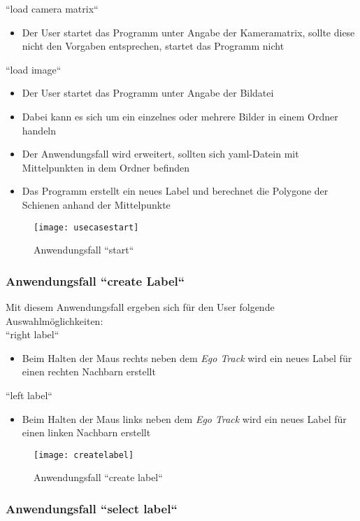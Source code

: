 \noindent
``load camera matrix``
\begin{itemize}
	\item Der User startet das Programm unter Angabe der Kameramatrix, sollte diese nicht den Vorgaben entsprechen, startet das Programm nicht
\end{itemize}
``load image``
\begin{itemize}
	\item Der User startet das Programm unter Angabe der Bildatei
	\item Dabei kann es sich um ein einzelnes oder mehrere Bilder in einem Ordner handeln
	\item Der Anwendungsfall wird erweitert, sollten sich yaml-Datein mit Mittelpunkten in dem Ordner befinden
	\item Das Programm erstellt ein neues Label und berechnet die Polygone der Schienen anhand der Mittelpunkte
\end{itemize}
\begin{figure}[H]
  \texttt{[image: usecasestart]}
  \caption{Anwendungsfall ``start``}
\end{figure}

\subsubsection{Anwendungsfall ``create Label``}
\label{sec:Anwendungsfall ``create Label``}

Mit diesem Anwendungsfall ergeben sich für den User folgende Auswahlmöglichkeiten:
\\

\noindent
``right label``
\begin{itemize}
	\item Beim Halten der Maus rechts neben dem \textit{Ego Track} wird ein neues Label für einen rechten Nachbarn erstellt
\end{itemize}
``left label``
\begin{itemize}
	\item Beim Halten der Maus links neben dem \textit{Ego Track} wird ein neues Label für einen linken Nachbarn erstellt
\end{itemize}
\begin{figure}[H]
  \texttt{[image: createlabel]}
  \caption{Anwendungsfall ``create label``}
\end{figure}

\subsubsection{Anwendungsfall ``select label``}
\label{sec:Anwendungsfall ``select label``}

